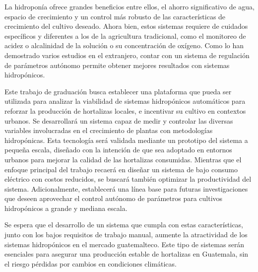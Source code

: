 La hidroponía ofrece grandes beneficios entre ellos, el ahorro significativo de agua, espacio de crecimiento y un control más robusto de las características de crecimiento del cultivo deseado. Ahora bien, estos sistemas requiere de cuidados específicos y diferentes a los de la agricultura tradicional, como el monitoreo de acidez o alcalinidad de la solución o su concentración de oxígeno. Como lo han demostrado varios estudios en el extranjero, contar con un sistema de regulación de parámetros autónomo permite obtener mejores resultados con sistemas hidropónicos. 

Este trabajo de graduación busca establecer una plataforma que pueda ser utilizada para analizar la viabilidad de sistemas hidropónicos automáticos para reforzar la producción de hortalizas locales, e incentivar su cultivo en contextos urbanos. Se desarrollará un sistema capaz de medir y controlar las diversas variables involucradas en el crecimiento de plantas con metodologías hidropónicas. Esta tecnología será validada mediante un prototipo del sistema a pequeña escala, diseñado con la intención de que sea adoptado en entornos urbanos para mejorar la calidad de las hortalizas consumidas. Mientras que el enfoque principal del trabajo recaerá en diseñar un sistema de bajo consumo eléctrico con costos reducidos, se buscará también optimizar la productividad del sistema. Adicionalmente, establecerá una línea base para futuras investigaciones que deseen aprovechar el control autónomo de parámetros para cultivos hidropónicos a grande y mediana escala. 

Se espera que el desarrollo de un sistema que cumpla con estas características, junto con los bajos requisitos de trabajo manual, aumente la atractividad de los sistemas hidropónicos en el mercado guatemalteco. Este tipo de sistemas serán esenciales para asegurar una producción estable de hortalizas en Guatemala, sin el riesgo pérdidas por cambios en condiciones climáticas. 